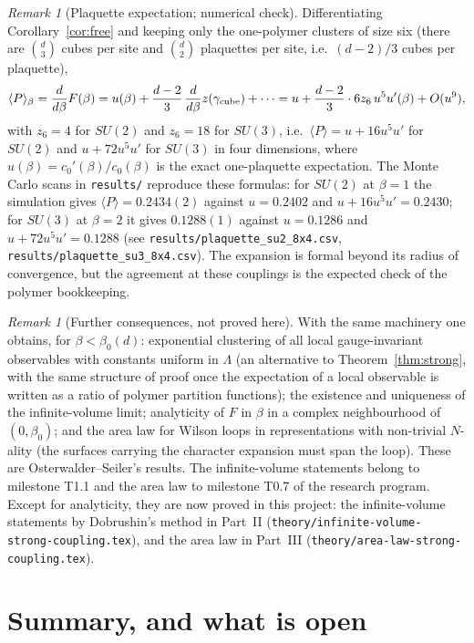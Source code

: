 \documentclass[11pt,a4paper]{article}
\theoremstyle{definition}
\theoremstyle{remark}
\newtheorem{remark}[theorem]{Remark}
\begin{document}
\begin{remark}[Plaquette expectation; numerical check]\label{rem:plaq}
Differentiating Corollary~\ref{cor:free} and keeping only the one-polymer clusters of size six (there are $\binom d3$
cubes per site and $\binom d2$ plaquettes per site, i.e.\ $(d-2)/3$ cubes per plaquette),
\[
\langle P\rangle_\beta=\frac{d}{d\beta}F(\beta)=u(\beta)+\frac{d-2}{3}\,\frac{d}{d\beta}z(\gamma_{\rm cube})+\cdots
= u+\frac{d-2}{3}\cdot6z_6\,u^5u'(\beta)+O(u^9),
\]
with $z_6=4$ for $SU(2)$ and $z_6=18$ for $SU(3)$, i.e.\ $\langle P\rangle=u+16u^5u'$ for $SU(2)$ and $u+72u^5u'$ for
$SU(3)$ in four dimensions, where $u(\beta)=c_0'(\beta)/c_0(\beta)$ is the exact one-plaquette expectation. The Monte Carlo
scans in \texttt{results/} reproduce these formulas: for $SU(2)$ at $\beta=1$ the simulation gives
$\langle P\rangle=0.2434(2)$ against $u=0.2402$ and $u+16u^5u'=0.2430$; for $SU(3)$ at $\beta=2$ it gives $0.1288(1)$ against
$u=0.1286$ and $u+72u^5u'=0.1288$ (see \texttt{results/plaquette\_su2\_8x4.csv}, \texttt{results/plaquette\_su3\_8x4.csv}).
The expansion is formal beyond its radius of convergence, but the agreement at these couplings is the expected check of
the polymer bookkeeping.
\end{remark}

\begin{remark}[Further consequences, not proved here]\label{rem:further}
With the same machinery one obtains, for $\beta<\beta_0(d)$: exponential clustering of all local gauge-invariant
observables with constants uniform in $\Lambda$ (an alternative to Theorem~\ref{thm:strong}, with the same structure
of proof once the expectation of a local observable is written as a ratio of polymer partition functions); the existence
and uniqueness of the infinite-volume limit; analyticity of $F$ in $\beta$ in a complex neighbourhood of $(0,\beta_0)$; and
the area law for Wilson loops in representations with non-trivial $N$-ality (the surfaces carrying the character
expansion must span the loop). These are Osterwalder--Seiler's results. The infinite-volume statements belong to milestone
T1.1 and the area law to milestone T0.7 of the research program. Except for analyticity, they are now proved in this project:
the infinite-volume statements by Dobrushin's method in Part~II (\texttt{theory/infinite-volume-strong-coupling.tex}), and the
area law in Part~III (\texttt{theory/area-law-strong-coupling.tex}).
\end{remark}

\section{Summary, and what is open}\label{sec:open}
\end{document}
